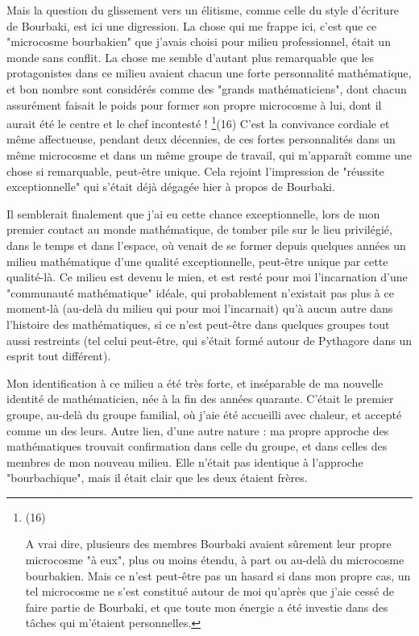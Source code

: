 Mais la question du glissement vers un élitisme, comme celle du style d'écriture de Bourbaki, est ici une digression. La chose qui me frappe ici, c'est que ce "microcosme bourbakien" que j'avais choisi pour milieu professionnel, était un monde sans conflit. La chose me semble d'autant plus remarquable que les protagonistes dans ce milieu avaient chacun une forte personnalité mathématique, et bon nombre sont considérés comme des "grands mathématiciens", dont chacun assurément faisait le poids pour former son propre microcosme à lui, dont il aurait été le centre et le chef incontesté ! \footnote{(16)\par A vrai dire, plusieurs des membres Bourbaki avaient sûrement leur propre microcosme "à eux", plus ou moins étendu, à part ou au-delà du microcosme bourbakien. Mais ce n'est peut-être pas un hasard si dans mon propre cas, un tel microcosme ne s'est constitué autour de moi qu'après que j'aie cessé de faire partie de Bourbaki, et que toute mon énergie a été investie dans des tâches qui m'étaient personnelles.}(16) C'est la convivance cordiale et même affectueuse, pendant deux décennies, de ces fortes personnalités dans un même microcosme et dans un même groupe de travail, qui m'apparaît comme une chose si remarquable, peut-être unique. Cela rejoint l'impression de "réussite exceptionnelle" qui s'était déjà dégagée hier à propos de Bourbaki.

Il semblerait finalement que j'ai eu cette chance exceptionnelle, lors de mon premier contact au monde mathématique, de tomber pile sur le lieu privilégié, dans le temps et dans l'espace, où venait de se former depuis quelques années un milieu mathématique d'une qualité exceptionnelle, peut-être unique par cette qualité-là. Ce milieu est devenu le mien, et est resté pour moi l'incarnation d'une "communauté mathématique" idéale, qui probablement n'existait pas plus à ce moment-là (au-delà du milieu qui pour moi l'incarnait) qu'à aucun autre dans l'histoire des mathématiques, si ce n'est peut-être dans quelques groupes tout aussi restreints (tel celui peut-être, qui s'était formé autour de Pythagore dans un esprit tout différent).

Mon identification à ce milieu a été très forte, et inséparable de ma nouvelle identité de mathématicien, née à la fin des années quarante. C'était le premier groupe, au-delà du groupe familial, où j’aie été accueilli avec chaleur, et accepté comme un des leurs. Autre lien, d'une autre nature : ma propre approche des mathématiques trouvait confirmation dans celle du groupe, et dans celles des membres de mon nouveau milieu. Elle n'était pas identique à l'approche "bourbachique", mais il était clair que les deux étaient frères.

